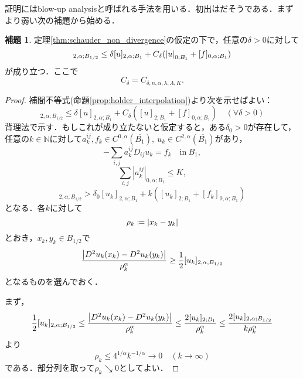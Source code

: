 \documentclass[a4paper]{ltjsarticle}
\newcommand{\Nset}{\mathbb{N}}
\newcommand{\inn}{\quad\text{in}\ }
\newcommand{\1}{\mathbbm{1}}
\numberwithin{equation}{section}
\theoremstyle{definition}
\newtheorem{lem}[thm]{補題}
\begin{document}
証明にはblow-up analysisと呼ばれる手法を用いる．初出は\cite{sim97}だそうである．まずより弱い次の補題から始める．
\begin{lem}\label{lem:blowup}
    定理\ref{thm:schauder_non_divergence}の仮定の下で，任意の$\delta>0$に対して
    \begin{equation}
        [u]_{2,\alpha;B_{1/2}}\leq \delta [u]_{2,\alpha;B_1}+C_\delta (\abs{u}_{0;B_1}+[f]_{0,\alpha;B_1}) 
    \end{equation}
    が成り立つ．ここで
    \begin{equation}
        C_{\delta}=C_{\delta,n,\alpha,\lambda,\Lambda,K}.
    \end{equation}
\end{lem}
\begin{proof}
    補間不等式(命題\ref{prop:holder_interpolation})より次を示せばよい：
    \begin{equation}
        [u]_{2,\alpha;B_{1/2}}\leq \delta [u]_{2,\alpha;B_1}+C_{\delta}([u]_{2;B_1}+[f]_{0,\alpha;B_1})\quad (\forall \delta>0)
    \end{equation}
    背理法で示す．もしこれが成り立たないと仮定すると，ある$\delta_0>0$が存在して，任意の$k\in\Nset$に対して$a^{ij}_k,f_k\in C^{0,\alpha}(\overline{B_1}),\ u_k\in C^{2,\alpha}(\overline{B_1})$があり，
    \begin{equation}
        -\sum_{i,j}a^{ij}_k D_{ij}u_k=f_k\inn B_1, 
    \end{equation}
    \begin{equation}
        \sum_{i,j}|a^{ij}_k|_{0,\alpha;B_1}\leq K,
    \end{equation}
    \begin{equation}
        [u_k]_{2,\alpha;B_{1/2}}>\delta_0[u_k]_{2,\alpha;B_1}+k([u_k]_{2;B_1}+[f_k]_{0,\alpha;B_1})
    \end{equation}
    となる．各$k$に対して
    \begin{equation}
        \rho_k\coloneqq \abs{x_k-y_k}
    \end{equation}
    とおき，$x_k,y_k\in B_{1/2}$で
    \begin{equation}
        \frac{\abs{D^2 u_k(x_k)-D^2 u_k (y_k)}}{\rho_k^\alpha}\geq \frac{1}{2}[u_k]_{2,\alpha,B_{1/2}}
    \end{equation}
    となるものを選んでおく．

    まず，
    \begin{equation}
        \frac{1}{2}[u_k]_{2,\alpha;B_{1/2}}\leq \frac{\abs{D^2u_k(x_k)-D^2u_k(y_k)}}{\rho_k^\alpha}\leq \frac{2[u_k]_{2;B_{1}}}{\rho_k^\alpha}\leq \frac{2[u_k]_{2,\alpha;B_{1/2}}}{k\rho_k^\alpha}  
    \end{equation}
    より
    \begin{equation}
        \rho_k\leq 4^{1/\alpha} k^{-1/\alpha}\to 0  \quad (k\to\infty )
    \end{equation}
    である．部分列を取って$\rho_k\searrow 0$としてよい．
    

\end{proof}
\end{document}
